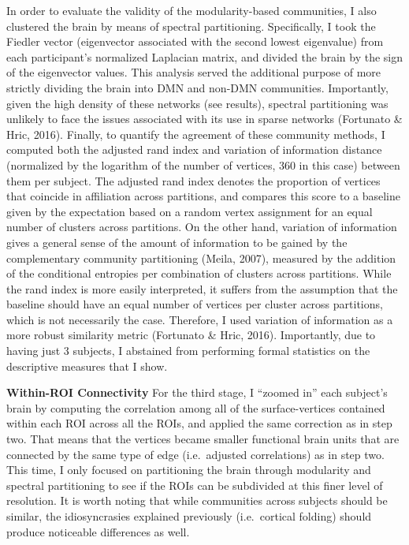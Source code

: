 \documentclass[9pt,twocolumn,twoside,]{pnas-new}
\begin{document}
In order to evaluate the validity of the modularity-based communities, I
also clustered the brain by means of spectral partitioning.
Specifically, I took the Fiedler vector (eigenvector associated with the
second lowest eigenvalue) from each participant's normalized Laplacian
matrix, and divided the brain by the sign of the eigenvector values.
This analysis served the additional purpose of more strictly dividing
the brain into DMN and non-DMN communities. Importantly, given the high
density of these networks (see results), spectral partitioning was
unlikely to face the issues associated with its use in sparse networks
(Fortunato \& Hric, 2016). Finally, to quantify the agreement of these
community methods, I computed both the adjusted rand index and variation
of information distance (normalized by the logarithm of the number of
vertices, 360 in this case) between them per subject. The adjusted rand
index denotes the proportion of vertices that coincide in affiliation
across partitions, and compares this score to a baseline given by the
expectation based on a random vertex assignment for an equal number of
clusters across partitions. On the other hand, variation of information
gives a general sense of the amount of information to be gained by the
complementary community partitioning (Meila, 2007), measured by the
addition of the conditional entropies per combination of clusters across
partitions. While the rand index is more easily interpreted, it suffers
from the assumption that the baseline should have an equal number of
vertices per cluster across partitions, which is not necessarily the
case. Therefore, I used variation of information as a more robust
similarity metric (Fortunato \& Hric, 2016). Importantly, due to having
just 3 subjects, I abstained from performing formal statistics on the
descriptive measures that I show.

\textbf{Within-ROI Connectivity} For the third stage, I ``zoomed in''
each subject's brain by computing the correlation among all of the
surface-vertices contained within each ROI across all the ROIs, and
applied the same correction as in step two. That means that the vertices
became smaller functional brain units that are connected by the same
type of edge (i.e.~adjusted correlations) as in step two. This time, I
only focused on partitioning the brain through modularity and spectral
partitioning to see if the ROIs can be subdivided at this finer level of
resolution. It is worth noting that while communities across subjects
should be similar, the idiosyncrasies explained previously
(i.e.~cortical folding) should produce noticeable differences as well.
\end{document}
